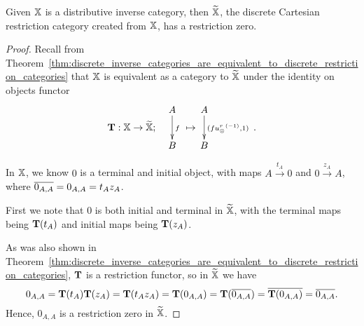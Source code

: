 \begin{lemma}\label{lem:x_tilde_has_a_restriction_zero}
  Given $\mathbb{X}$ is a distributive inverse category, then $\widetilde{\mathbb{X}}$, the discrete Cartesian restriction
  category created from $\mathbb{X}$, has a restriction zero.
\end{lemma}
\begin{proof}
  Recall from Theorem~\ref{thm:discrete_inverse_categories_are_equivalent_to_discrete_restriction_categories}
  that $\mathbb{X}$ is equivalent as a category to $\widetilde{\mathbb{X}}$ under the identity on objects
  functor
  \[
    {\raisebox{-18pt}{$\wtf:\X \to \Xt;$}} \quad
    \xymatrix{A\ar[d]^{f}\\B}\ \raisebox{-18pt}{$\mapsto$}\, \xymatrix{A\ar[d]^{(f\inv{\usr},1)}\\B}
    \,\raisebox{-18pt}{.}
  \]

  In $\mathbb{X}$, we know $0$ is a terminal and initial object, with maps
  $A \xrightarrow{t_A} 0 $ and $0 \xrightarrow{z_A} A$, where  $\overline{0_{A,A}} = 0_{A,A} = t_A z_A$.

  First we note that $0$ is both initial and terminal in $\widetilde{\mathbb{X}}$, with the terminal maps being
  $\mathbf{T}(t_A)$ and initial maps being $\mathbf{T}(z_A)$.

  As was also shown in
  Theorem~\ref{thm:discrete_inverse_categories_are_equivalent_to_discrete_restriction_categories},
$\mathbf{T}$ is a restriction functor, so in $\widetilde{\mathbb{X}}$ we have
  \[
    0_{A,A} = \mathbf{T}(t_A)\mathbf{T}(z_A) = \mathbf{T}(t_A z_A) = \mathbf{T}(0_{A,A}) = \mathbf{T}(\overline{0_{A,A}}) =
    \overline{\mathbf{T}(0_{A,A})} = \overline{0_{A,A}}.
  \]
  Hence, $0_{A,A}$ is a restriction zero in $\widetilde{\mathbb{X}}$.
\end{proof}

